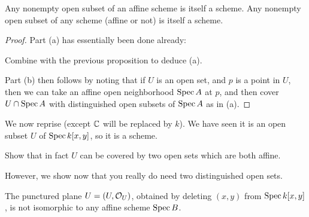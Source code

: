 \begin{corollary}
	\listhack
	\begin{enumerate}[(a)]
		\ii Any nonempty open subset of an affine scheme is itself a scheme.
		\ii Any nonempty open subset of any scheme (affine or not) is itself a scheme.
	\end{enumerate}
\end{corollary}
\begin{proof}
	Part (a) has essentially been done already:
	\begin{ques}
		Combine 
		with the previous proposition to deduce (a).
	\end{ques}
	Part (b) then follows by noting that if $U$ is an open set,
	and $p$ is a point in $U$,
	then we can take an affine open neighborhood $\operatorname{Spec} A$ at $p$,
	and then cover $U \cap \operatorname{Spec} A$ with distinguished
	open subsets of $\operatorname{Spec} A$ as in (a).
\end{proof}

We now reprise 
(except $\mathbb C$ will be replaced by $k$).
We have seen it is an open subset $U$ of $\operatorname{Spec} k[x,y]$, so it is a scheme.
\begin{ques}
	Show that in fact $U$ can be covered by
	two open sets which are both affine.
\end{ques}
However, we show now that you really do need two distinguished open sets.
\begin{proposition}
	The punctured plane $U = (U, \mathcal O_U)$,
	obtained by deleting $(x,y)$ from $\operatorname{Spec} k[x,y]$,
	is not isomorphic to any affine scheme $\operatorname{Spec} B$.
\end{proposition}

